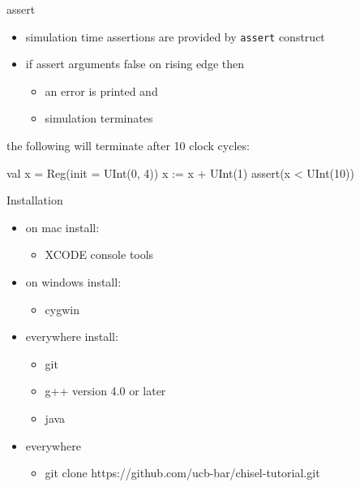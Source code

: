 \documentclass[xcolor=pdflatex,dvipsnames,table]{beamer}
\begin{document}
\begin{frame}[fragile]{assert}
\begin{itemize}
\item simulation time assertions are provided by \verb+assert+ construct
\item if assert arguments false on rising edge then 
\begin{itemize}
\item an error is printed and 
\item simulation terminates
\end{itemize}
\end{itemize}
the following will terminate after 10 clock cycles:
\begin{scala}
val x = Reg(init = UInt(0, 4))
x := x + UInt(1)
assert(x < UInt(10))
\end{scala}
\end{frame}

\begin{frame}[fragile]{Installation}
\begin{itemize}
\item on mac install:
\begin{itemize}
\item XCODE console tools
\end{itemize}
\item on windows install:
\begin{itemize}
\item cygwin
\end{itemize}
\item everywhere install:
\begin{itemize}
\item git
\item g++ version 4.0 or later
\item java
\end{itemize}
\item everywhere
\begin{itemize}
\item git clone https://github.com/ucb-bar/chisel-tutorial.git
\end{itemize}
\end{itemize}

\end{frame}
\end{document}
